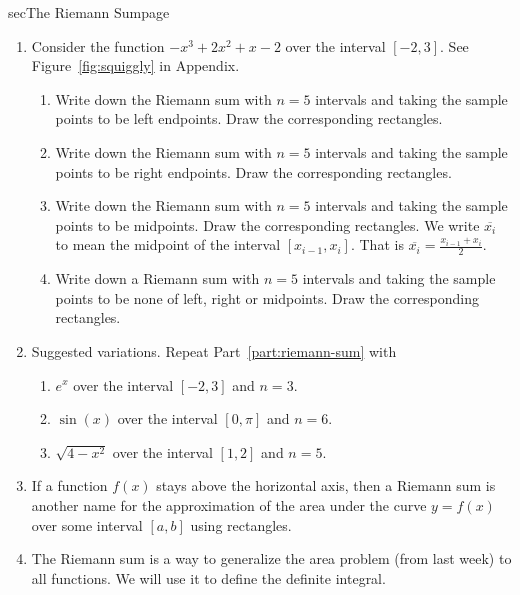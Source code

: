 \documentclass[../main]{subfiles}
\begin{document}
\begin{outline}{sec}{The Riemann Sum}{page}
\begin{enumerate}
    \item \label{part:riemann-sum} Consider the function \(-x^{3} + 2 x^{2} + x - 2\) over the interval \([-2,3]\). See Figure~\ref{fig:squiggly} in Appendix.
      \begin{enumerate}[label=(\alph*)]
        \item \label{part:riemann-sum-left} Write down the Riemann sum with \(n = 5\) intervals and taking the sample points to be left endpoints. Draw the corresponding rectangles.
        \item \label{part:riemann-sum-right} Write down the Riemann sum with \(n = 5\) intervals and taking the sample points to be right endpoints. Draw the corresponding rectangles.
        \item \label{part:riemann-sum-mid} Write down the Riemann sum with \(n = 5\) intervals and taking the sample points to be midpoints. Draw the corresponding rectangles. We write \(\overline{x_{i}}\) to mean the midpoint of the interval \([x_{i-1}, x_{i}]\). That is \(\overline{x_{i}} = \frac{x_{i-1} + x_{i}}{2}\).%

        \item Write down a Riemann sum with \(n = 5\) intervals and taking the sample points to be none of left, right or midpoints. Draw the corresponding rectangles.
      \end{enumerate}
    \item Suggested variations. Repeat Part~\ref{part:riemann-sum} with
      \begin{enumerate}
        \item \(e^{x}\) over the interval \([-2, 3]\) and \(n = 3\).
        \item \(\sin(x)\) over the interval \([0,\pi]\) and \(n = 6\).
        \item \(\sqrt{4 - x^{2}}\) over the interval \([1,2]\) and \(n = 5\).
      \end{enumerate}
    \item {If a function \(f(x)\) stays above the horizontal axis, then a Riemann sum is another name for the approximation of the area under the curve \(y = f(x)\) over some interval \([a,b]\) using rectangles.}
    \item {The Riemann sum is a way to generalize the area problem (from last week) to all functions. We will use it to define the definite integral.}
  \end{enumerate}
\end{outline}
\end{document}
